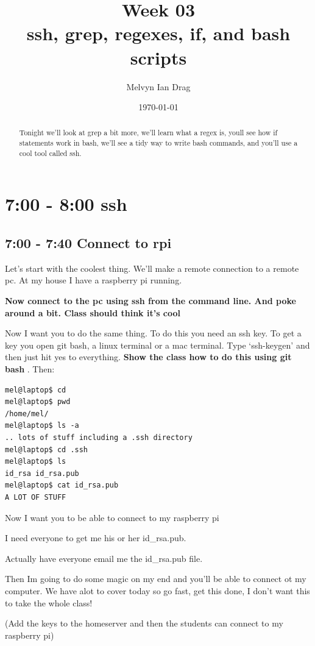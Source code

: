 \documentclass[10pt]{article}
\title{\textbf{Week 03} \\
ssh, grep, regexes, if, and bash scripts
}
\author{
	Melvyn Ian Drag
}
\date{\today}
\begin{document}
\maketitle

\begin{abstract}
Tonight we'll look at grep a bit more, we'll learn what a regex is, youll see
how if statements work in bash, we'll see a tidy way to write bash commands, and
you'll use a cool tool called ssh.
\end{abstract}

\section{7:00 - 8:00 ssh}
\subsection{7:00 - 7:40 Connect to rpi}
Let's start with the coolest thing. We'll make a remote connection to a remote
pc. At my house I have a raspberry pi running. 

{\LARGE \textbf{Now connect to the pc using ssh from the command line. And poke
around a bit. Class should think it's cool}}

Now I want you to do the same thing. To do this you need an ssh key. To get a
key you open git bash, a linux terminal or a mac terminal. Type `ssh-keygen' and
then just hit yes to everything. \textbf{Show the class how to do this using git
bash }. Then:

\begin{lstlisting}[style=term]
mel@laptop$ cd 
mel@laptop$ pwd
/home/mel/
mel@laptop$ ls -a
.. lots of stuff including a .ssh directory
mel@laptop$ cd .ssh
mel@laptop$ ls 
id_rsa id_rsa.pub
mel@laptop$ cat id_rsa.pub
A LOT OF STUFF
\end{lstlisting}

Now I want you to be able to connect to my raspberry pi

I need everyone to get me his or her id\_rsa.pub.

Actually have everyone email me the id\_rsa.pub file.


Then Im going to do some magic on my end and you'll be able to connect ot my
computer. We have alot to cover today so go fast, get this done, I don't want
this to take the whole class!

(Add the keys to the homeserver and then the students can connect to my
raspberry pi)
\end{document}
